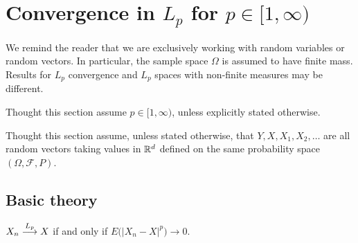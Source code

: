 \clearpage
%
%
\section{Convergence in $L_p$ for $p\in [1,\infty)$}

\begin{warning} We remind the reader that we are exclusively working with random variables or random vectors. In particular, the sample space $\Omega$ is assumed to have finite mass. Results for $L_p$ convergence and $L_p$ spaces with non-finite measures may be different.
\end{warning}


\begin{sectionassumption}
Thought this section assume $p\in[1,\infty)$, unless explicitly stated otherwise.
\end{sectionassumption}



\begin{sectionassumption}
Thought this section assume, unless stated otherwise, that $Y, X, X_1, X_2,\ldots$ are all random vectors taking values in $\Bbb R^d$ defined on the same probability space $(\Omega, \mathcal F, P)$. 
\end{sectionassumption}



%
%
\subsection{Basic theory}



\begin{definition}
$ X_n\overset{\small L_p} \longrightarrow X $ if and only if  $E\bigl(|X_n - X|^p \bigr) \rightarrow 0$.
\end{definition}


